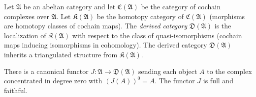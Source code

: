 Let $\mathfrak{A}$ be an abelian category and let $\mathfrak{C}(\mathfrak{A})$ be the category of cochain complexes over $\mathfrak{A}$. Let $\mathfrak{K}(\mathfrak{A})$ be the homotopy category of $\mathfrak{C}(\mathfrak{A})$ (morphisms are homotopy classes of cochain maps). The {\it derived category} $\mathfrak{D}(\mathfrak{A})$ is the localization of $\mathfrak{K}(\mathfrak{A})$ with respect to the class of quasi-isomorphisms (cochain maps inducing isomorphisms in cohomology). The derived category $\mathfrak{D}(\mathfrak{A})$ inherits a triangulated structure from $\mathfrak{K}(\mathfrak{A})$.

There is a canonical functor $J : \mathfrak{A} \to \mathfrak{D}(\mathfrak{A})$ sending each object $A$ to the complex concentrated in degree zero with $(J(A))^0 = A$. The functor $J$ is full and faithful.
